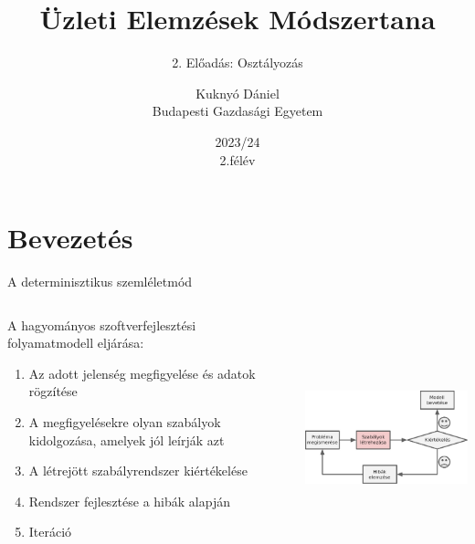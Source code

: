\documentclass[english, aspectratio=169]{beamer}
\makeatletter
\newcommand\makebeamertitle{\frame{\maketitle}}
\let\origtableofcontents=\tableofcontents
\def\tableofcontents{\@ifnextchar[{\origtableofcontents}{\gobbletableofcontents}}
\def\gobbletableofcontents#1{\origtableofcontents}
\makeatother
\begin{document}
\section{Bevezetés}
\title[]{Üzleti Elemzések Módszertana}
\subtitle{2. Előadás: Osztályozás}
\author[Kuknyó Dániel]{Kuknyó Dániel\\Budapesti Gazdasági Egyetem}
\date{2023/24\\2.félév}
\makebeamertitle

\begin{frame}
\tableofcontents{}
\end{frame}

\begin{frame}
\tableofcontents[currentsection]
\end{frame}

\begin{frame}{A determinisztikus szemléletmód}
\begin{columns}
\begin{column}{.5\textwidth}
A hagyományos szoftverfejlesztési folyamatmodell eljárása:
\begin{enumerate}
	\item Az adott jelenség megfigyelése és adatok rögzítése
	\item A megfigyelésekre olyan szabályok kidolgozása, amelyek jól leírják azt
	\item A létrejött szabályrendszer kiértékelése
	\item Rendszer fejlesztése a hibák alapján
	\item Iteráció
\end{enumerate}
\end{column}
\begin{column}{.5\textwidth}
\begin{center}
\includegraphics[width=7cm, height=7cm, keepaspectratio]{images/osztalyozas_1.png}
\end{center}
\end{column}
\end{columns}
\end{frame}
\end{document}
